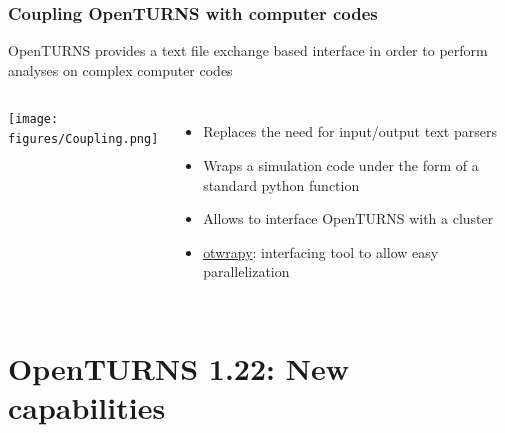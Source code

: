 \documentclass{beamer}
\begin{document}
\begin{frame}[containsverbatim]
  \frametitle{Coupling OpenTURNS with computer codes}
  
  \small
  
  OpenTURNS provides a text file exchange based interface in order to perform analyses on complex computer codes
  
  \vspace{10pt}
  
  \begin{columns}
      
  \centering
  
  \texttt{[image: figures/Coupling.png]}
  
  
  \begin{itemize}
  \item Replaces the need for input/output text parsers
  \item Wraps a simulation code under the form of a standard python function
  \item Allows to interface OpenTURNS with a cluster
  \item \href{https://openturns.github.io/otwrapy/master/index.html}{otwrapy}: interfacing tool to allow easy parallelization
  \end{itemize}
  
  \end{columns}
  
\end{frame}


\section{OpenTURNS 1.22: New capabilities}

\usetikzlibrary {arrows.meta} %
\end{document}
